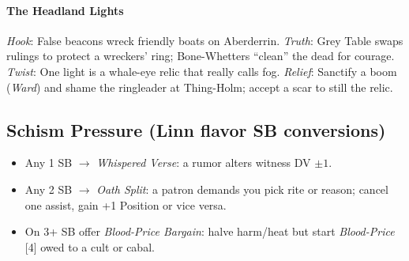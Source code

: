 \paragraph{The Headland Lights}
\emph{Hook}: False beacons wreck friendly boats on Aberderrin. \emph{Truth}: Grey Table swaps rulings to protect a wreckers’ ring; Bone-Whetters “clean” the dead for courage. \emph{Twist}: One light is a whale-eye relic that really calls fog. \emph{Relief}: Sanctify a boom (\emph{Ward}) and shame the ringleader at Thing-Holm; accept a scar to still the relic.

\subsection*{Schism Pressure (Linn flavor SB conversions)}
\begin{itemize}
  \item Any 1 SB $\rightarrow$ \emph{Whispered Verse}: a rumor alters witness DV $\pm 1$.
  \item Any 2 SB $\rightarrow$ \emph{Oath Split}: a patron demands you pick rite or reason; cancel one assist, gain +1 Position or vice versa.
  \item On 3+ SB offer \emph{Blood-Price Bargain}: halve harm/heat but start \emph{Blood-Price} [4] owed to a cult or cabal.
\end{itemize}